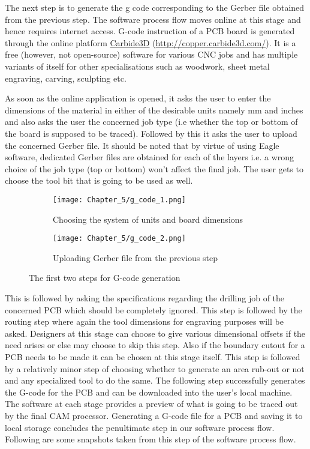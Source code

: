 The next step is to generate the g code corresponding to the Gerber file obtained from the previous step. The software process flow moves online at this stage and hence requires internet access. G-code instruction of a PCB board is generated through the online platform \href{http://copper.carbide3d.com/}{Carbide3D} (\url{http://copper.carbide3d.com/}). It is a free (however, not open-source) software for various CNC jobs and has multiple variants of itself for other specialisations such as woodwork, sheet metal engraving, carving, sculpting etc. \par

As soon as the online application is opened, it asks the user to enter the dimensions of the material in either of the desirable units namely mm and inches and also asks the user the concerned job type (i.e whether the top or bottom of the board is supposed to be traced). Followed by this it asks the user to upload the concerned Gerber file. It should be noted that by virtue of using Eagle software, dedicated Gerber files are obtained for each of the layers i.e. a wrong choice of the job type (top or bottom) won’t affect the final job. The user gets to choose the tool bit that is going to be used as well. \pagebreak

\begin{figure}[h]
    \begin{subfigure}{0.5\textwidth}
    \texttt{[image: Chapter\_5/g\_code\_1.png]}
    \caption{Choosing the system of units and board dimensions}
    \label{fig:g1}
    \end{subfigure}
    \begin{subfigure}{0.5\textwidth}
    \texttt{[image: Chapter\_5/g\_code\_2.png]}
    \caption{Uploading Gerber file from the previous step}
    \label{fig:g2}
    \end{subfigure}
    \caption{The first two steps for G-code generation}
    \label{fig:g12}
\end{figure}

This is followed by asking the specifications regarding the drilling job of the concerned PCB which should be completely ignored. This step is followed by the routing step where again the tool dimensions for engraving purposes will be asked. Designers at this stage can choose to give various dimensional offsets if the need arises or else may choose to skip this step. Also if the boundary cutout for a PCB needs to be made it can be chosen at this stage itself. This step is followed by a relatively minor step of choosing whether to generate an area rub-out or not and any specialized tool to do the same. The following step successfully generates the G-code for the PCB and can be downloaded into the user’s local machine. The software at each stage provides a preview of what is going to be traced out by the final CAM processor. Generating a G-code file for a PCB and saving it to local storage concludes the penultimate step in our software process flow. Following are some snapshots taken from this step of the software process flow. \par

